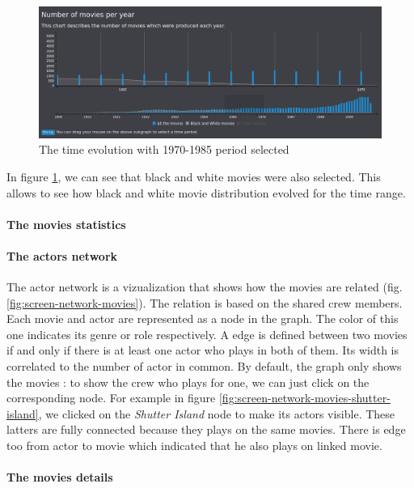 \documentclass[a4paper,10pt]{article}
\begin{document}
\begin{figure}[ht]
  \centering
  \includegraphics[width=1\linewidth]{images/screens/time-selection.png}
  \caption{The time evolution with 1970-1985 period selected} \label{fig:time-selection}
\end{figure}

In figure \ref{fig:time-selection}, we can see that black and white movies were
also selected. This allows to see how black and white movie distribution evolved
for the time range.

\paragraph{The movies statistics}

\paragraph{The actors network} The actor network is a vizualization that shows how the movies are related (fig. \ref{fig:screen-network-movies}).
The relation is based on the shared crew members. Each movie and actor are represented as
a node in the graph. The color of this one indicates its genre or role respectively.
A edge is defined between two movies if and only if there is at least one actor who
plays in both of them. Its width is correlated to the number of actor in common.
By default, the graph only shows the movies : to show the crew who plays for one,
we can just click on the corresponding node. For example in figure \ref{fig:screen-network-movies-shutter-island},
we clicked on the \textit{Shutter Island} node to make its actors visible. These latters are fully connected
because they plays on the same movies. There is edge too from actor to movie which indicated that he also
plays on linked movie.

\paragraph{The movies details}
\end{document}
